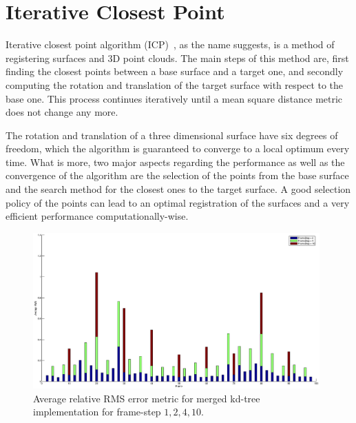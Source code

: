 \section{Iterative Closest Point}
\label{icp}

Iterative closest point algorithm (ICP)~\cite{icpOr}, as the name suggests, is a method of registering surfaces and 3D point clouds. The main steps of this method are, first  finding the closest points between a base surface and a target one, and secondly computing the rotation and translation of the target surface with respect to the base one. This process continues iteratively until a mean square distance metric does not change any more.

The rotation and translation of a three dimensional surface have six degrees of freedom, which the algorithm is guaranteed to converge to a local optimum every time. What is more, two major aspects regarding the performance as well as the convergence of the algorithm are the selection of the points from the base surface and the search method for the closest ones to the target surface. A good selection policy of the points can lead to an optimal registration of the surfaces and a very efficient performance computationally-wise.

\begin{figure}[ht!]
  \centering
    \includegraphics[width=0.98\textwidth]{figures/RMSmergedKD.eps}
    \caption{Average relative RMS error metric for merged kd-tree implementation for frame-step $1,2,4,10$.}
    \label{fig:rmsmergederror}
\end{figure}

